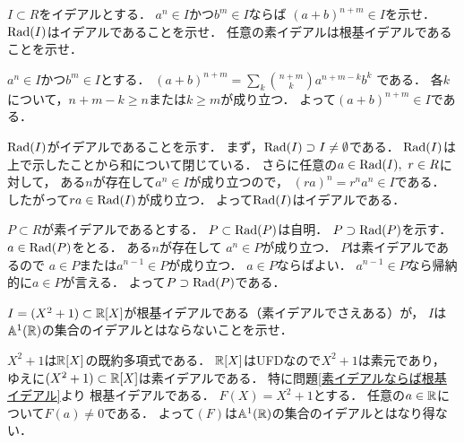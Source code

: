 \begin{prob}\label{素イデアルならば根基イデアル}
  $I\subset R$をイデアルとする．
  $a^n \in I$かつ$b^m\in I$ならば
  $(a+b)^{n+m} \in I$を示せ．
  $\mathrm{Rad}(I)$はイデアルであることを示せ．
  任意の素イデアルは根基イデアルであることを示せ．
\end{prob}
\begin{ans}
  $a^n \in I$かつ$b^m\in I$とする．
  $(a+b)^{n+m} = \sum_{k} \binom{n+m}{k} a^{n+m-k}b^k$
  である．
  各$k$について，$n+m-k \ge n$または$k \ge m$が成り立つ．
  よって$(a+b)^{n+m} \in I$である．

  $\mathrm{Rad}(I)$がイデアルであることを示す．
  まず，$\mathrm{Rad}(I) \supset I \ne \emptyset $である．
  $\mathrm{Rad}(I)$は上で示したことから和について閉じている．
  さらに任意の$a \in \mathrm{Rad}(I), \ r\in R$に対して，
  ある$n$が存在して$ a^n \in I$が成り立つので，
  $ (ra)^n = r^n a^n \in I $である．
  したがって$ra \in \mathrm{Rad}(I)$が成り立つ．
  よって$\mathrm{Rad}(I)$はイデアルである．

  $P\subset R$が素イデアルであるとする．
  $P \subset \mathrm{Rad}(P)$は自明．
  $P \supset \mathrm{Rad}(P)$を示す．
  $ a\in \mathrm{Rad}(P)$をとる．
  ある$n$が存在して
  $ a^n \in P$が成り立つ．
  $P$は素イデアルであるので
  $a\in P$または$a^{n-1} \in P$が成り立つ．
  $a\in P$ならばよい．
  $a^{n-1} \in P$なら帰納的に$a\in P$が言える．
  よって$P \supset \mathrm{Rad}(P)$である．
\end{ans}

\begin{prob}
  $I = (X^2 + 1) \subset \mathbb{R}[X]$が根基イデアルである（素イデアルでさえある）が，
  $I$は$\mathbb{A}^1(\mathbb{R})$の集合のイデアルとはならないことを示せ．
\end{prob}
\begin{ans}
  $X^2 + 1$は$\mathbb{R}[X]$の既約多項式である．
  $\mathbb{R}[X]$はUFDなので$X^2+1$は素元であり，
  ゆえに$(X^2+1) \subset \mathbb{R}[X]$は素イデアルである．
  特に問題\ref{素イデアルならば根基イデアル}より
  根基イデアルである．
  $F(X) = X^2 + 1$とする．
  任意の$a \in \mathbb{R}$について$F(a) \ne 0$である．
  よって$(F)$は$\mathbb{A}^1(\mathbb{R})$の集合のイデアルとはなり得ない．
\end{ans}
